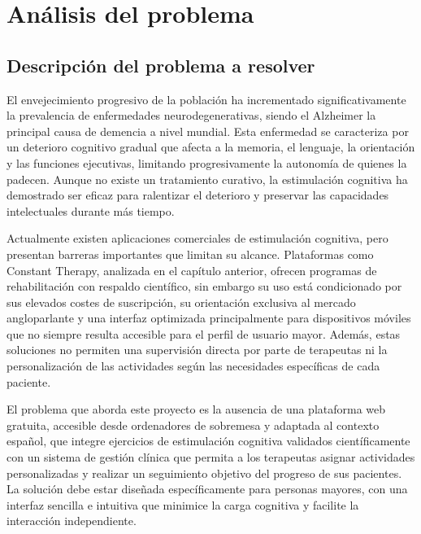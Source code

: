 \chapter{Análisis del problema}
\section{Descripción del problema a resolver}

El envejecimiento progresivo de la población ha incrementado significativamente la prevalencia de enfermedades neurodegenerativas, siendo el Alzheimer la principal causa de demencia a nivel mundial. Esta enfermedad se caracteriza por un deterioro cognitivo gradual que afecta a la memoria, el lenguaje, la orientación y las funciones ejecutivas, limitando progresivamente la autonomía de quienes la padecen. Aunque no existe un tratamiento curativo, la estimulación cognitiva ha demostrado ser eficaz para ralentizar el deterioro y preservar las capacidades intelectuales durante más tiempo.

Actualmente existen aplicaciones comerciales de estimulación cognitiva, pero presentan barreras importantes que limitan su alcance. Plataformas como Constant Therapy, analizada en el capítulo anterior, ofrecen programas de rehabilitación con respaldo científico, sin embargo su uso está condicionado por sus elevados costes de suscripción, su orientación exclusiva al mercado angloparlante y una interfaz optimizada principalmente para dispositivos móviles que no siempre resulta accesible para el perfil de usuario mayor. Además, estas soluciones no permiten una supervisión directa por parte de terapeutas ni la personalización de las actividades según las necesidades específicas de cada paciente.

El problema que aborda este proyecto es la ausencia de una plataforma web gratuita, accesible desde ordenadores de sobremesa y adaptada al contexto español, que integre ejercicios de estimulación cognitiva validados científicamente con un sistema de gestión clínica que permita a los terapeutas asignar actividades personalizadas y realizar un seguimiento objetivo del progreso de sus pacientes. La solución debe estar diseñada específicamente para personas mayores, con una interfaz sencilla e intuitiva que minimice la carga cognitiva y facilite la interacción independiente.


